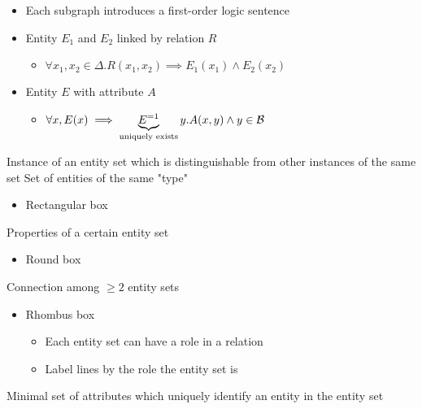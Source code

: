 \begin{itemize}
\begin{itemize}
            \item Each subgraph introduces a first-order logic sentence
            \item Entity $E_1$ and $E_2$ linked by relation $R$
                \begin{itemize}
                    \item $\forall x_1, x_2 \in \Delta. R(x_1, x_2) \implies E_1(x_1) \wedge E_2(x_2)$
                \end{itemize}
            \item Entity $E$ with attribute $A$
                \begin{itemize}
                    \item $\forall x, E(x) \implies \underbrace{E^{=1}}_{\text{uniquely exists}} y. A(x, y) \wedge y \in \mathcal{B}$
                \end{itemize}
        \end{itemize}
        \begin{description}
             Instance of an entity set which is distinguishable from other instances of the same set
             Set of entities of the same "type"
                \begin{itemize}
                    \item Rectangular box
                \end{itemize}
             Properties of a certain entity set
                \begin{itemize}
                    \item Round box
                \end{itemize}
             Connection among $\ge 2$ entity sets
                \begin{itemize}
                    \item Rhombus box
                        \begin{itemize}
                            \item Each entity set can have a role in a relation
                            \item Label lines by the role the entity set is
                        \end{itemize}
                \end{itemize}
             Minimal set of attributes which uniquely identify an entity in the entity set
                \begin{description}

\end{description}
\end{description}
\end{itemize}
